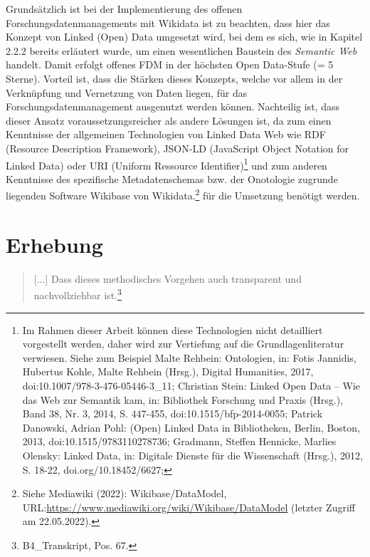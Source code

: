 Grundsätzlich ist bei der Implementierung des offenen Forschungsdatenmanagements mit Wikidata ist zu beachten, dass hier das Konzept von Linked (Open) Data umgesetzt wird, bei dem es sich, wie in Kapitel 2.2.2 bereits erläutert wurde, um einen wesentlichen Baustein des \textit{Semantic Web} handelt. Damit erfolgt offenes FDM in der höchsten Open Data-Stufe (= 5 Sterne). Vorteil ist, dass die Stärken dieses Konzepts, welche vor allem in der Verknüpfung und Vernetzung von Daten liegen, für das Forschungsdatenmanagement ausgenutzt werden können. Nachteilig ist, dass dieser Ansatz voraussetzungsreicher als andere Lösungen ist, da zum einen Kenntnisse der allgemeinen Technologien von Linked Data Web wie RDF (Resource Description Framework), JSON-LD (JavaScript Object Notation for Linked Data) oder URI (Uniform Ressource Identifier)\footnote{Im Rahmen dieser Arbeit können diese Technologien nicht detailliert vorgestellt werden, daher wird zur Vertiefung auf die Grundlagenliteratur verwiesen. Siehe zum Beispiel Malte Rehbein: Ontologien, in: Fotis Jannidis, Hubertus Kohle, Malte Rehbein (Hrsg.), Digital Humanities, 2017, doi:10.1007/978-3-476-05446-3\_11; Christian Stein: Linked Open Data – Wie das Web zur Semantik kam, in: Bibliothek Forschung und Praxis (Hrsg.), Band 38, Nr. 3, 2014, S. 447-455, doi:10.1515/bfp-2014-0055; Patrick Danowski, Adrian Pohl: (Open) Linked Data in Bibliotheken, Berlin, Boston, 2013, doi:10.1515/9783110278736; Gradmann, Steffen Hennicke, Marlies Olensky: Linked Data, in: Digitale Dienste für die Wissenschaft (Hrsg.), 2012, S. 18-22, doi.org/10.18452/6627;  } und zum anderen Kenntnisse des spezifische Metadatenschemas bzw. der Onotologie zugrunde liegenden Software Wikibase von Wikidata.\footnote{Siehe Mediawiki (2022): Wikibase/DataModel, URL:\url{https://www.mediawiki.org/wiki/Wikibase/DataModel} (letzter Zugriff am 22.05.2022).} für die Umsetzung benötigt werden.

\section{Erhebung}

\begin{quote}
    [...] Dass dieses methodisches Vorgehen auch transparent und nachvollziehbar ist.\footnote{B4\_Transkript, Pos. 67.}
\end{quote}

